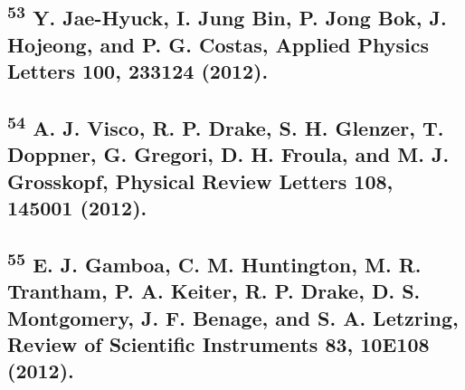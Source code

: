\subsection{\texorpdfstring{\textsuperscript{53} Y. Jae-Hyuck, I. Jung
Bin, P. Jong Bok, J. Hojeong, and P. G. Costas, Applied Physics Letters
100, 233124
(2012).}{53 Y. Jae-Hyuck, I. Jung Bin, P. Jong Bok, J. Hojeong, and P. G. Costas, Applied Physics Letters 100, 233124 (2012).}}\label{y.-jae-hyuck-i.-jung-bin-p.-jong-bok-j.-hojeong-and-p.-g.-costas-applied-physics-letters-100-233124-2012.}

\subsection{\texorpdfstring{\textsuperscript{54} A. J. Visco, R. P.
Drake, S. H. Glenzer, T. Doppner, G. Gregori, D. H. Froula, and M. J.
Grosskopf, Physical Review Letters 108, 145001
(2012).}{54 A. J. Visco, R. P. Drake, S. H. Glenzer, T. Doppner, G. Gregori, D. H. Froula, and M. J. Grosskopf, Physical Review Letters 108, 145001 (2012).}}\label{a.-j.-visco-r.-p.-drake-s.-h.-glenzer-t.-doppner-g.-gregori-d.-h.-froula-and-m.-j.-grosskopf-physical-review-letters-108-145001-2012.}

\subsection{\texorpdfstring{\textsuperscript{55} E. J. Gamboa, C. M.
Huntington, M. R. Trantham, P. A. Keiter, R. P. Drake, D. S. Montgomery,
J. F. Benage, and S. A. Letzring, Review of Scientific Instruments 83,
10E108
(2012).}{55 E. J. Gamboa, C. M. Huntington, M. R. Trantham, P. A. Keiter, R. P. Drake, D. S. Montgomery, J. F. Benage, and S. A. Letzring, Review of Scientific Instruments 83, 10E108 (2012).}}\label{e.-j.-gamboa-c.-m.-huntington-m.-r.-trantham-p.-a.-keiter-r.-p.-drake-d.-s.-montgomery-j.-f.-benage-and-s.-a.-letzring-review-of-scientific-instruments-83-10e108-2012.}


